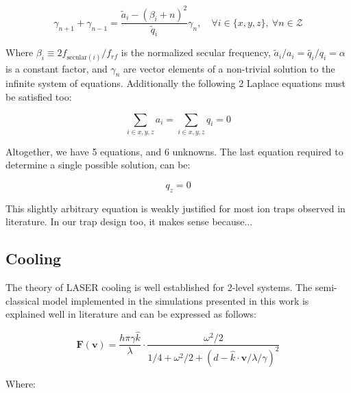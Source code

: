 \begin{equation}
	\gamma_{n+1} + \gamma_{n-1} = \frac{\tilde{a}_i - \left(\beta_i + n\right)^2}{\tilde{q}_i} \gamma_n,\quad \forall i\in\{x,y,z\},\ \forall n\in\mathcal{Z}
\end{equation}

Where $\beta_i \equiv 2 f_{\mathrm{secular}(i)}/f_{rf}$ is the normalized secular frequency, $\tilde{a}_i/a_i = \tilde{q_i}/q_i = \alpha$ is a constant factor, and $\gamma_n$ are vector elements of a non-trivial solution to the infinite system of equations. Additionally the following 2 Laplace equations must be satisfied too:

\begin{equation}
	\sum_{i\in{x,y,z}} a_i = \sum_{i\in{x,y,z}} q_i = 0
\end{equation}

Altogether, we have 5 equations, and 6 unknowns. The last equation required to determine a single possible solution, can be:

\begin{equation}
	q_z = 0
\end{equation}

This slightly arbitrary equation is weakly justified for most ion traps observed in literature. In our trap design too, it makes sense because...


\subsection{Cooling}

The theory of LASER cooling is well established for 2-level systems. The semi-classical model implemented in the simulations presented in this work is explained well in literature\cite{TannoudjiCooling,SteckCooling} and can be expressed as follows:

\begin{equation}
	\mathbf{F}(\mathbf{v}) = \frac{h \pi \gamma \hat{k}}{\lambda} \cdot \frac{\omega^2/2}{1/4 + \omega^2/2 + (d - \hat{k}\cdot\mathbf{v}/\lambda/\gamma)^2}
	\label{eq:laser-cool-force}
\end{equation}

Where:

